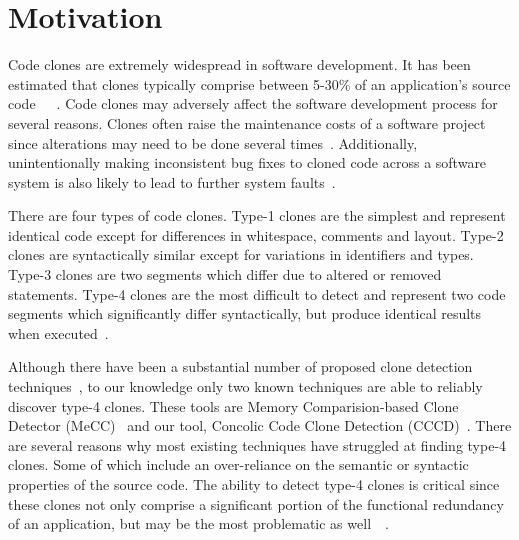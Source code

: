 \documentclass{article}
\begin{document}
\maketitle


\section{Motivation}




Code clones are extremely widespread in software development. It has been estimated that clones typically comprise between 5-30\% of an application's source code~\cite{Baxter:1998:CDU:850947.853341}~\cite{Schulze:2010:CCF:1942788.1868310}~\cite{Kim:2005:ESC:1095430.1081737}. Code clones may adversely affect the software development process for several reasons. Clones often raise the maintenance costs of a software project since alterations may need to be done several times~\cite{Juergens:2009:CCM:1555001.1555062}. Additionally, unintentionally making inconsistent bug fixes to cloned code across a software system is also likely to lead to further system faults~\cite{Deissenboeck_2010}. 

There are four types of code clones. Type-1 clones are the simplest and represent identical code except for differences in whitespace, comments and layout. Type-2 clones are syntactically similar except for variations in identifiers and types. Type-3 clones are two segments which differ due to altered or removed statements. Type-4 clones are the most difficult to detect and represent two code segments which significantly differ syntactically, but produce identical results when executed~\cite{Gold:2010:ICC:1808901.1808916}. 

Although there have been a substantial number of proposed clone detection techniques~\cite{Roy07asurvey}, to our knowledge only two known techniques are able to reliably discover type-4 clones. These tools are Memory Comparision-based Clone Detector (MeCC)~\cite{Kim:2011:MMC:1985793.1985835} and our tool, Concolic Code Clone Detection (CCCD)~\cite{wcre2013}. There are several reasons why most existing techniques have struggled at finding type-4 clones. Some of which include an over-reliance on the semantic or syntactic properties of the source code. The ability to detect type-4 clones is critical since these clones not only comprise a significant portion of the functional redundancy of an application, but may be the most problematic as well~\cite{Roy:2009:CEC:1530898.1531101}~\cite{Yuan:2011:CCM:2114489.2114766}. 
\end{document}
